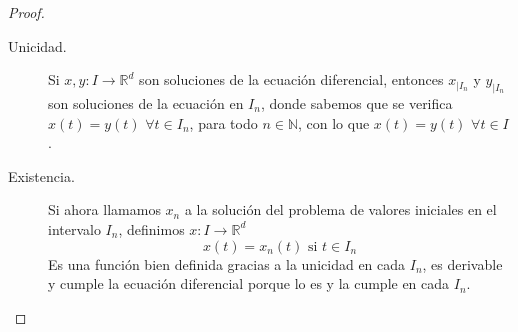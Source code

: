 \begin{teo}
\begin{proof}
\begin{itemize}
                \begin{description}
                    \item [Unicidad.] Si $x,y:I\rightarrow\mathbb{R}^d$ son soluciones de la ecuación diferencial, entonces $x_{|I_n}$ y $y_{|I_n}$ son soluciones de la ecuación en $I_n$, donde sabemos que se verifica $x(t) = y(t)$ $\forall t\in I_n$, para todo $n\in \mathbb{N}$, con lo que $x(t) = y(t)$ $\forall t\in I$.
                    \item [Existencia.] Si ahora llamamos $x_n$ a la solución del problema de valores iniciales en el intervalo $I_n$, definimos $x:I\rightarrow\mathbb{R}^d$ 
                        \begin{equation*}
                            x(t) = x_n(t) \text{\ si\ } t\in I_n
                        \end{equation*}
                        Es una función bien definida gracias a la unicidad en cada $I_n$, es derivable y cumple la ecuación diferencial porque lo es y la cumple en cada $I_n$.
                \end{description}
        \end{itemize}
    \end{proof}
\end{teo}

